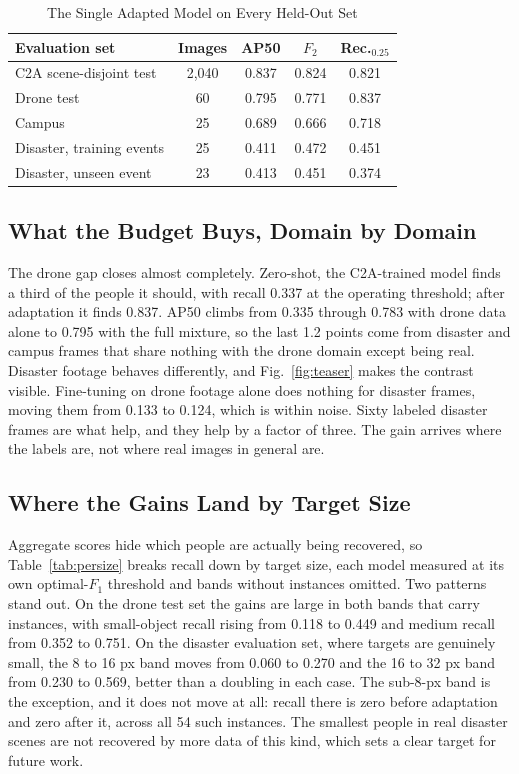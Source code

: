 \documentclass[conference,a4paper]{IEEEtran}
\begin{document}
\begin{table}[htbp]
\caption{The Single Adapted Model on Every Held-Out Set}
\label{tab:multi}
\begin{center}
\begin{tabular}{|l|c|c|c|c|}
\hline
\textbf{Evaluation set} & \textbf{Images} & \textbf{AP50} & \textbf{$F_2$} & \textbf{Rec.$_{0.25}$} \\
\hline
C2A scene-disjoint test & 2,040 & 0.837 & 0.824 & 0.821 \\
\hline
Drone test & 60 & 0.795 & 0.771 & 0.837 \\
\hline
Campus & 25 & 0.689 & 0.666 & 0.718 \\
\hline
Disaster, training events & 25 & 0.411 & 0.472 & 0.451 \\
\hline
Disaster, unseen event & 23 & 0.413 & 0.451 & 0.374 \\
\hline
\end{tabular}
\end{center}
\end{table}

\subsection{What the Budget Buys, Domain by Domain}
The drone gap closes almost completely. Zero-shot, the C2A-trained model finds
a third of the people it should, with recall 0.337 at the operating threshold;
after adaptation it finds 0.837. AP50 climbs from 0.335 through 0.783 with
drone data alone to 0.795 with the full mixture, so the last 1.2 points come
from disaster and campus frames that share nothing with the drone domain except
being real. Disaster footage behaves differently, and Fig.~\ref{fig:teaser}
makes the contrast visible. Fine-tuning on drone footage alone does nothing for
disaster frames, moving them from 0.133 to 0.124, which is within noise. Sixty
labeled disaster frames are what help, and they help by a factor of three. The
gain arrives where the labels are, not where real images in general are.

\subsection{Where the Gains Land by Target Size}
Aggregate scores hide which people are actually being recovered, so
Table~\ref{tab:persize} breaks recall down by target size, each model measured
at its own optimal-$F_1$ threshold and bands without instances omitted. Two
patterns stand out. On the drone test set the gains are large in both bands that carry
instances, with small-object recall rising from 0.118 to 0.449 and medium
recall from 0.352 to 0.751. On the disaster evaluation set, where targets are
genuinely small, the 8 to 16 px band moves from 0.060 to 0.270 and the 16 to 32
px band from 0.230 to 0.569, better than a doubling in each case. The sub-8-px
band is the exception, and it does not move at all: recall there is zero before
adaptation and zero after it, across all 54 such instances. The smallest people
in real disaster scenes are not recovered by more data of this kind, which sets
a clear target for future work.
\end{document}
